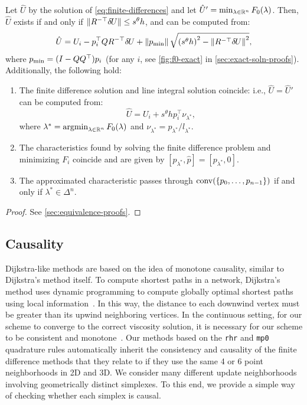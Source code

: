 \documentclass[sisc-eikonal.tex]{subfiles}
\begin{document}
\begin{theorem}\label{thm:equivalence}
  Let $\hat{U}$ by the solution of \cref{eq:finite-differences} and
  let $\hat{U}' = \min_{\lambda \in \mathbb{R}^n} F_0(\lambda)$. Then,
  $\hat{U}$ exists if and only if
  $\|R^{-\top} {\delta \hspace{-0.09em} U}\| \leq s^\theta h$, and can be computed from:
  \begin{equation}
    \label{eq:U-finite-diff}
    \hat{U} = U_i - p_i^\top Q R^{-\top} \delU + \norm{\pmin} \sqrt{{(s^\theta h)}^2 - \norm{R^{-\top} \delU}^2},
  \end{equation}
  where $p_{\operatorname{min}} = (I - QQ^\top) p_i$ (for any $i$, see
  \cref{fig:f0-exact} in \cref{sec:exact-soln-proofs}). Additionally,
  the following hold:
  \begin{enumerate}
  \item The finite difference solution and line integral solution
    coincide: i.e., $\hat{U} = \hat{U}'$ can be computed from:
    \begin{equation}
      \label{eq:U-from-Ui-exact}
      \hat{U} = U_i + s^\theta h p_i^\top \nu_{\lambda^*},
    \end{equation}
    where $\lambda^* = \operatorname{argmin}_{\lambda \in \mathbb{R}^n} F_0(\lambda)$ and
    $\nu_{\lambda^*} = p_{\lambda^*}/l_{\lambda^*}$.
  \item The characteristics found by solving the finite difference
    problem and minimizing $F_i$ coincide and are given by
    $[p_{\lambda^*}, \hat{p}] = [p_{\lambda^*}, 0]$.
  \item The approximated characteristic passes through
    $\operatorname{conv}(\left\{p_0, \hdots, p_{n-1}\right\})$ if and only if
    $\lambda^* \in \Delta^n$.
  \end{enumerate}
\end{theorem}

\begin{proof}
  See \cref{sec:equivalence-proofs}.
\end{proof}

\subsection{Causality}\label{ssec:causality} Dijkstra-like
methods are based on the idea of monotone causality, similar to
Dijkstra's method itself. To compute shortest paths in a network,
Dijkstra's method uses dynamic programming to compute globally optimal
shortest paths using local information~\cite{dijkstra1959note}. In
this way, the distance to each downwind vertex must be greater than
its upwind neighboring vertices. In the continuous setting, for our
scheme to converge to the correct viscosity solution, it is necessary
for our scheme to be consistent and
monotone~\cite{crandall1983viscosity}. Our methods based on the
\texttt{rhr} and \texttt{mp0} quadrature rules automatically inherit
the consistency and causality of the finite difference methods that
they relate to if they use the same 4 or 6 point neighborhoods in 2D
and 3D. We consider many different update neighborhoods involving
geometrically distinct simplexes. To this end, we provide a simple way
of checking whether each simplex is causal.
\end{document}
